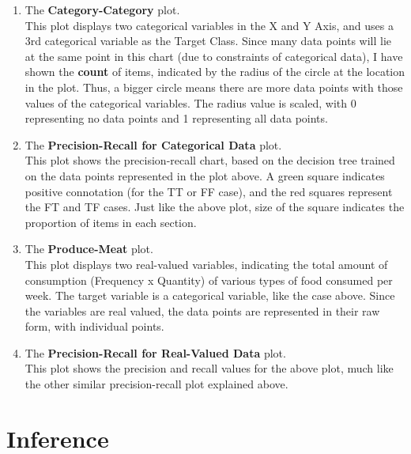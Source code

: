 \documentclass[11pt,handout]{article}
\begin{document}
\begin{enumerate}
	\item The \textbf{Category-Category} plot.\\
	
	This plot displays two categorical variables in the X and Y Axis, and uses a 3rd categorical variable as the Target Class. Since many data points will lie at the same point in this chart (due to constraints of categorical data), I have shown the \textbf{count} of items, indicated by the radius of the circle at the location in the plot. Thus, a bigger circle means there are more data points with those values of the categorical variables. The radius value is scaled, with 0 representing no data points and 1 representing all data points.\\
	
	\item The \textbf{Precision-Recall for Categorical Data} plot.\\
	
	This plot shows the precision-recall chart, based on the decision tree trained on the data points represented in the plot above. A green square indicates positive connotation (for the TT or FF case), and the red squares represent the FT and TF cases. Just like the above plot, size of the square indicates the proportion of items in each section. \\
	
	\item The \textbf{Produce-Meat} plot.\\
	
	This plot displays two real-valued variables, indicating the total amount of consumption (Frequency x Quantity) of various types of food consumed per week. The target variable is a categorical variable, like the case above. Since the variables are real valued, the data points are represented in their raw form, with individual points.\\
	
	\item The \textbf{Precision-Recall for Real-Valued Data} plot.\\
	
	This plot shows the precision and recall values for the above plot, much like the other similar precision-recall plot explained above.\\
	
\end{enumerate}

\section{Inference}
\end{document}
